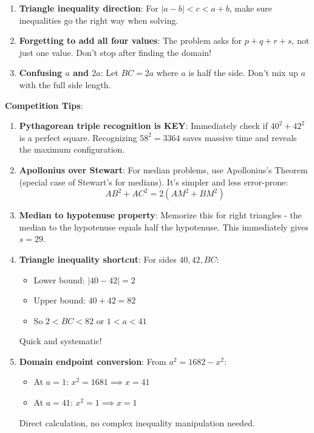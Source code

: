 \documentclass[12pt]{article}
\begin{document}
\begin{warningbox}
\begin{enumerate}
    \item \textbf{Triangle inequality direction}: For $|a - b| < c < a + b$, make sure inequalities go the right way when solving.
    
    \item \textbf{Forgetting to add all four values}: The problem asks for $p + q + r + s$, not just one value. Don't stop after finding the domain!
    
    \item \textbf{Confusing $a$ and $2a$}: Let $BC = 2a$ where $a$ is half the side. Don't mix up $a$ with the full side length.
\end{enumerate}
\end{warningbox}

\begin{tipbox}
\textbf{Competition Tips}:

\begin{enumerate}
    \item \textbf{Pythagorean triple recognition is KEY}: Immediately check if $40^2 + 42^2$ is a perfect square. Recognizing $58^2 = 3364$ saves massive time and reveals the maximum configuration.
    
    \item \textbf{Apollonius over Stewart}: For median problems, use Apollonius's Theorem (special case of Stewart's for medians). It's simpler and less error-prone:
    $$AB^2 + AC^2 = 2(AM^2 + BM^2)$$
    
    \item \textbf{Median to hypotenuse property}: Memorize this for right triangles - the median to the hypotenuse equals half the hypotenuse. This immediately gives $s = 29$.
    
    \item \textbf{Triangle inequality shortcut}: For sides $40, 42, BC$:
    \begin{itemize}
        \item Lower bound: $|40 - 42| = 2$
        \item Upper bound: $40 + 42 = 82$
        \item So $2 < BC < 82$ or $1 < a < 41$
    \end{itemize}
    Quick and systematic!
    
    \item \textbf{Domain endpoint conversion}: From $a^2 = 1682 - x^2$:
    \begin{itemize}
        \item At $a = 1$: $x^2 = 1681 \implies x = 41$
        \item At $a = 41$: $x^2 = 1 \implies x = 1$
    \end{itemize}
    Direct calculation, no complex inequality manipulation needed.
    

\end{enumerate}
\end{tipbox}
\end{document}
